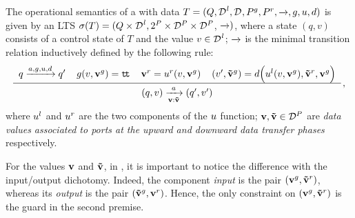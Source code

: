 \begin{definition}
  \label{defn:data:semantics}
  The operational semantics of a \compmodel{} with data $T = (Q,
  \local{\data}, \data, \pin, \pout, \goesto{}, \guard, \up, \down)$ is
  given by an LTS $\undata{T} = (Q \times \local{\data}, 2^P \times
  \data[P] \times \data[P]$, \mbox{$\goesto{})$}, where a state $(q, v)$
  consists of a control state of $T$ and the value $v \in \local{\data}$;
  $\goesto{}$ is the minimal transition relation inductively defined by the
  following rule:
  \begin{equation}
    \label{eq:data:semantics}
    \renewcommand{\arraystretch}{1.5}
    \derrule[4]{
      q \goesto{a,\guard,\up,\down} q'
      &
      \guard(v, \grant{\portdata{v}}) = \true
      &
      \request{\portdata{v}} = 
      \request{\up}(v, \grant{\portdata{v}})
      &
      (v', \grant{\portdata{\tilde{v}}}) =
      \down\Big(
      \local{\up}(v, \grant{\portdata{v}}),
      \request{\portdata{\tilde{v}}}, 
      \grant{\portdata{v}}
      \Big)
    }{
      (q, v)
      \goesto[\portdata{v}:\portdata{\tilde{v}}]{a}
      (q', v')
    }\,,
  \end{equation}
  where $\local{\up}$ and $\request{\up}$ are the two components of the
  $\up$ function; $\portdata{v}, \portdata{\tilde{v}} \in \data[P]$ are
  \emph{data values associated to ports at the upward and downward data
    transfer phases} respectively.
\end{definition}

For the values $\portdata{v}$ and $\portdata{\tilde{v}}$, in
, it is important to notice the difference with the
input/output dichotomy.  Indeed, the component \emph{input} is the pair
$(\grant{\portdata{v}}, \request{\portdata{\tilde{v}}})$, whereas its
\emph{output} is the pair $(\grant{\portdata{\tilde{v}}},
\request{\portdata{v}})$.  Hence, the only constraint on
$(\grant{\portdata{v}}, \request{\portdata{\tilde{v}}})$ is the guard in
the second premise.


